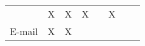 \begin{table}[tbph]
\begin{minipage}{\textwidth}
\begin{tabular}{p{3cm}ccccccl}
                                                                         & \cellcolor[rgb]{.906, .902, .902} X                                                                                                                                                                                                                                                                                                                                                                                                                                                                                                                     %
                                                                         & X                                                                                                                                                                                                                                                                                                                                                                                                                                                                                                                                                       %
                                                                         &
            \cellcolor[rgb]{
                .906,  .902,
                .902} X %
                                                                         &                                                                                                                                                                                                                                                                                                                                                                                                                                                                                                                                                         %
                                                                         &
            \cellcolor[rgb]{ .906,  .902,  .902} X %
                                                                         & \cite{vianna2014a,vianna2019searching}                                                                                                                                                                                                                                                                                                                                                                                                                                                                                                                  \\
            \rowcolor[rgb]
            { .851,  .851,  .851}  E-mail                                & X
                                                                         & X
                                                                         &


\end{tabular}
\end{minipage}
\end{table}
